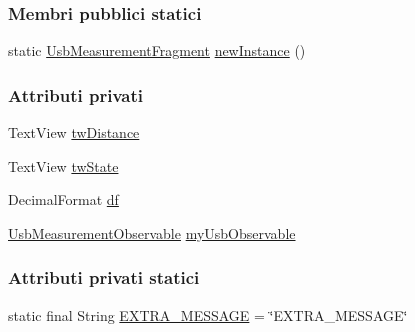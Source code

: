 \subsubsection*{Membri pubblici statici}
\begin{DoxyCompactItemize}
\item 
static \hyperlink{classit_1_1unibo_1_1torsello_1_1bluetoothpositioning_1_1fragment_1_1usbObservers_1_1UsbMeasurementFragment}{Usb\+Measurement\+Fragment} \hyperlink{classit_1_1unibo_1_1torsello_1_1bluetoothpositioning_1_1fragment_1_1usbObservers_1_1UsbMeasurementFragment_a89f816d627cf4902d2886de7cd222f81_a89f816d627cf4902d2886de7cd222f81}{new\+Instance} ()
\end{DoxyCompactItemize}
\subsubsection*{Attributi privati}
\begin{DoxyCompactItemize}
\item 
Text\+View \hyperlink{classit_1_1unibo_1_1torsello_1_1bluetoothpositioning_1_1fragment_1_1usbObservers_1_1UsbMeasurementFragment_a6158a86ee112db847f0bca648d8e21fc_a6158a86ee112db847f0bca648d8e21fc}{tw\+Distance}
\item 
Text\+View \hyperlink{classit_1_1unibo_1_1torsello_1_1bluetoothpositioning_1_1fragment_1_1usbObservers_1_1UsbMeasurementFragment_a5ce90223eb1d85ed6dffa5ef36d7ff69_a5ce90223eb1d85ed6dffa5ef36d7ff69}{tw\+State}
\item 
Decimal\+Format \hyperlink{classit_1_1unibo_1_1torsello_1_1bluetoothpositioning_1_1fragment_1_1usbObservers_1_1UsbMeasurementFragment_af6289af98cd03600b07581b83e267e96_af6289af98cd03600b07581b83e267e96}{df}
\item 
\hyperlink{classit_1_1unibo_1_1torsello_1_1bluetoothpositioning_1_1observables_1_1UsbMeasurementObservable}{Usb\+Measurement\+Observable} \hyperlink{classit_1_1unibo_1_1torsello_1_1bluetoothpositioning_1_1fragment_1_1usbObservers_1_1UsbMeasurementFragment_a7fdf4e32275a804a354c5e1c3e439970_a7fdf4e32275a804a354c5e1c3e439970}{my\+Usb\+Observable}
\end{DoxyCompactItemize}
\subsubsection*{Attributi privati statici}
\begin{DoxyCompactItemize}
\item 
static final String \hyperlink{classit_1_1unibo_1_1torsello_1_1bluetoothpositioning_1_1fragment_1_1usbObservers_1_1UsbMeasurementFragment_a46f0a0e379c852c7418ce13340077a70_a46f0a0e379c852c7418ce13340077a70}{E\+X\+T\+R\+A\+\_\+\+M\+E\+S\+S\+A\+GE} = \char`\"{}E\+X\+T\+R\+A\+\_\+\+M\+E\+S\+S\+A\+GE\char`\"{}
\end{DoxyCompactItemize}



